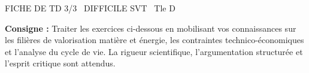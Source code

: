 \documentclass[11pt]{article}
\begin{document}
\begin{tcolorbox}[enhanced,colback=popink,colframe=popink,arc=10pt,boxrule=0pt,left=12pt,right=12pt,top=9pt,bottom=9pt]
{\color{white}\popxbold\small FICHE DE TD 3/3 \textbullet\ DIFFICILE \hfill SVT \textbullet\ Tle D\par}
\end{tcolorbox}
\vspace{4pt}
\noindent \textbf{Consigne :} Traiter les exercices ci-dessous en mobilisant vos connaissances sur les filières de valorisation matière et énergie, les contraintes technico-économiques et l'analyse du cycle de vie. La rigueur scientifique, l'argumentation structurée et l'esprit critique sont attendus.
\end{document}
